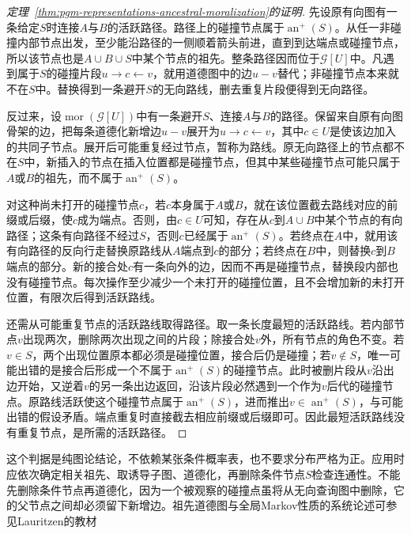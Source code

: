 \begin{proof}[定理~\ref{thm:pgm-representations-ancestral-moralization}的证明]
先设原有向图有一条给定$S$时连接$A$与$B$的活跃路径。路径上的碰撞节点属于$\operatorname{an}^{+}(S)$。从任一非碰撞内部节点出发，至少能沿路径的一侧顺着箭头前进，直到到达端点或碰撞节点，所以该节点也是$A\cup B\cup S$中某个节点的祖先。整条路径因而位于$\mathcal{G}[U]$中。凡遇到属于$S$的碰撞片段$u\to c\leftarrow v$，就用道德图中的边$u-v$替代；非碰撞节点本来就不在$S$中。替换得到一条避开$S$的无向路线，删去重复片段便得到无向路径。

反过来，设$\operatorname{mor}(\mathcal{G}[U])$中有一条避开$S$、连接$A$与$B$的路径。保留来自原有向图骨架的边，把每条道德化新增边$u-v$展开为$u\to c\leftarrow v$，其中$c\in U$是使该边加入的共同子节点。展开后可能重复经过节点，暂称为路线。原无向路径上的节点都不在$S$中，新插入的节点在插入位置都是碰撞节点，但其中某些碰撞节点可能只属于$A$或$B$的祖先，而不属于$\operatorname{an}^{+}(S)$。

对这种尚未打开的碰撞节点$c$，若$c$本身属于$A$或$B$，就在该位置截去路线对应的前缀或后缀，使$c$成为端点。否则，由$c\in U$可知，存在从$c$到$A\cup B$中某个节点的有向路径；这条有向路径不经过$S$，否则$c$已经属于$\operatorname{an}^{+}(S)$。若终点在$A$中，就用该有向路径的反向行走替换原路线从$A$端点到$c$的部分；若终点在$B$中，则替换$c$到$B$端点的部分。新的接合处$c$有一条向外的边，因而不再是碰撞节点，替换段内部也没有碰撞节点。每次操作至少减少一个未打开的碰撞位置，且不会增加新的未打开位置，有限次后得到活跃路线。

还需从可能重复节点的活跃路线取得路径。取一条长度最短的活跃路线。若内部节点$v$出现两次，删除两次出现之间的片段；除接合处$v$外，所有节点的角色不变。若$v\in S$，两个出现位置原本都必须是碰撞位置，接合后仍是碰撞；若$v\notin S$，唯一可能出错的是接合后形成一个不属于$\operatorname{an}^{+}(S)$的碰撞节点。此时被删片段从$v$沿出边开始，又逆着$v$的另一条出边返回，沿该片段必然遇到一个作为$v$后代的碰撞节点。原路线活跃使这个碰撞节点属于$\operatorname{an}^{+}(S)$，进而推出$v\in\operatorname{an}^{+}(S)$，与可能出错的假设矛盾。端点重复时直接截去相应前缀或后缀即可。因此最短活跃路线没有重复节点，是所需的活跃路径。
\end{proof}

这个判据是纯图论结论，不依赖某张条件概率表，也不要求分布严格为正。应用时应依次确定相关祖先、取诱导子图、道德化，再删除条件节点$S$检查连通性。不能先删除条件节点再道德化，因为一个被观察的碰撞点虽将从无向查询图中删除，它的父节点之间却必须留下新增边。祖先道德图与全局Markov性质的系统论述可参见Lauritzen的教材

